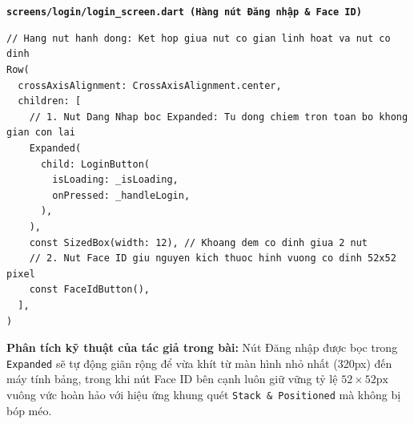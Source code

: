 \documentclass[aspectratio=169, 10pt]{beamer}
\newcommand{\SlideHeader}[2]{%
  \noindent{\textcolor{AccentOrange}{\textbf{\footnotesize #1}}}\\[0.08cm]
  \noindent{\Large \textbf{\textcolor{NavyTitle}{#2}}}\\[0.22cm]
}
\begin{document}
\begin{frame}[fragile]
  \SlideHeader{MINH HỌA MÃ NGUỒN TÁC GIẢ}{Phân Bổ Không Gian Hàng Nút Bằng Expanded \& Fixed}

  \textbf{\texttt{screens/login/login\_screen.dart (Hàng nút Đăng nhập \& Face ID)}}
\begin{lstlisting}
// Hang nut hanh dong: Ket hop giua nut co gian linh hoat va nut co dinh
Row(
  crossAxisAlignment: CrossAxisAlignment.center,
  children: [
    // 1. Nut Dang Nhap boc Expanded: Tu dong chiem tron toan bo khong gian con lai
    Expanded(
      child: LoginButton(
        isLoading: _isLoading,
        onPressed: _handleLogin,
      ),
    ),
    const SizedBox(width: 12), // Khoang dem co dinh giua 2 nut
    // 2. Nut Face ID giu nguyen kich thuoc hinh vuong co dinh 52x52 pixel
    const FaceIdButton(), 
  ],
)
\end{lstlisting}

  \begin{tcolorbox}[colback=CardBg, colframe=NavyHeader!30, arc=4pt, boxrule=0.8pt, top=5pt, bottom=5pt]
    {\scriptsize \textbf{Phân tích kỹ thuật của tác giả trong bài:} Nút Đăng nhập được bọc trong \texttt{Expanded} sẽ tự động giãn rộng để vừa khít từ màn hình nhỏ nhất (320px) đến máy tính bảng, trong khi nút Face ID bên cạnh luôn giữ vững tỷ lệ $52 \times 52\text{px}$ vuông vức hoàn hảo với hiệu ứng khung quét \texttt{Stack \& Positioned} mà không bị bóp méo.}
  \end{tcolorbox}
\end{frame}
\end{document}
